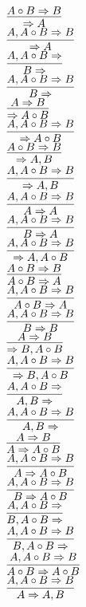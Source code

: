 \documentclass[11pt]{article}
\begin{document}
\begin{center}

$\infer{\Rightarrow A}{A\circ B\Rightarrow B}$
\bigskip
\\$\infer{\Rightarrow A}{A, A\circ B\Rightarrow B}$
\bigskip
\\$\infer{B\Rightarrow }{A, A\circ B\Rightarrow }$
\bigskip
\\$\infer{B\Rightarrow }{A, A\circ B\Rightarrow B}$
\bigskip
\\$\infer{\Rightarrow A\circ B}{A\Rightarrow B}$
\bigskip
\\$\infer{\Rightarrow A\circ B}{A, A\circ B\Rightarrow B}$
\bigskip
\\$\infer{\Rightarrow A, B}{A\circ B\Rightarrow B}$
\bigskip
\\$\infer{\Rightarrow A, B}{A, A\circ B\Rightarrow B}$
\bigskip
\\$\infer{A\Rightarrow A}{A, A\circ B\Rightarrow B}$
\bigskip
\\$\infer{B\Rightarrow A}{A, A\circ B\Rightarrow B}$
\bigskip
\\$\infer{\Rightarrow A, A\circ B}{A, A\circ B\Rightarrow B}$
\bigskip
\\$\infer{A\circ B\Rightarrow A}{A\circ B\Rightarrow B}$
\bigskip
\\$\infer{A\circ B\Rightarrow A}{A, A\circ B\Rightarrow B}$
\bigskip
\\$\infer{B\Rightarrow B}{A, A\circ B\Rightarrow B}$
\bigskip
\\$\infer{\Rightarrow B, A\circ B}{A\Rightarrow B}$
\bigskip
\\$\infer{\Rightarrow B, A\circ B}{A, A\circ B\Rightarrow B}$
\bigskip
\\$\infer{A, B\Rightarrow }{A, A\circ B\Rightarrow }$
\bigskip
\\$\infer{A, B\Rightarrow }{A, A\circ B\Rightarrow B}$
\bigskip
\\$\infer{A\Rightarrow A\circ B}{A\Rightarrow B}$
\bigskip
\\$\infer{A\Rightarrow A\circ B}{A, A\circ B\Rightarrow B}$
\bigskip
\\$\infer{B\Rightarrow A\circ B}{A, A\circ B\Rightarrow B}$
\bigskip
\\$\infer{B, A\circ B\Rightarrow }{A, A\circ B\Rightarrow }$
\bigskip
\\$\infer{B, A\circ B\Rightarrow }{A, A\circ B\Rightarrow B}$
\bigskip
\\$\infer{A\circ B\Rightarrow A\circ B}{A, A\circ B\Rightarrow B}$
\bigskip
\\$\infer{A\Rightarrow A, B}{A, A\circ B\Rightarrow B}$

\end{center}
\end{document}
